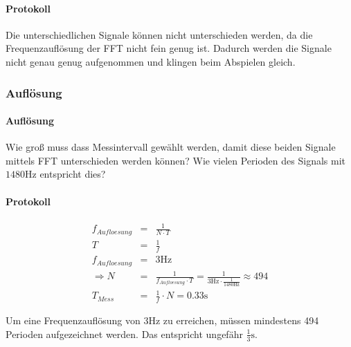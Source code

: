\documentclass[10pt]{scrreprt}
\begin{document}
        \paragraph{Protokoll}

        Die unterschiedlichen Signale können nicht unterschieden werden, da die
        Frequenzauflösung der FFT nicht fein genug ist. Dadurch werden die Signale nicht genau
        genug aufgenommen und klingen beim Abspielen gleich.


        \subsubsection{Auflösung}
        \paragraph{Auflösung}
        Wie groß muss dass Messintervall gewählt werden, damit diese beiden Signale
        mittels FFT unterschieden werden können? Wie vielen Perioden des Signals mit
        $1480\si{\hertz}$ entspricht dies?
        \paragraph{Protokoll}

        \begin{eqnarray*}
            f_{Aufloesung} &=& \frac{1}{N \cdot T}\\
            T &=& \frac{1}{f}\\
            f_{Aufloesung} &=& 3 \si{\hertz}\\
            \Rightarrow N &=& \frac{1}{f_{Aufloesung} \cdot T} = \frac{1}{3 \si{\hertz} \cdot \frac{1}{1480\si{\hertz}}} \approx 494\\
            T_{Mess} &=& \frac{1}{f} \cdot N = 0.33 \si{\second}
        \end{eqnarray*}

        Um eine Frequenzauflösung von $3\si{\hertz}$ zu erreichen, müssen mindestens
        494 Perioden aufgezeichnet werden. Das entspricht ungefähr $\frac{1}{3} \si{\second}$.
\end{document}
